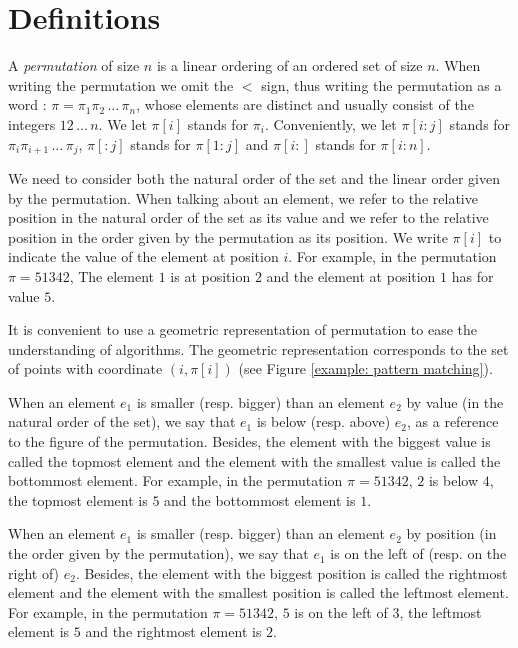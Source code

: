 \documentclass[a4paper]{llncs}
\begin{document}

\section{Definitions}
\label{section:Definitions}

A \textit{permutation} of size $n$ is a linear ordering of an ordered set of size $n$.
When writing the permutation we omit the $<$ sign, thus
writing the permutation as a word  :
$\pi = \pi_1\pi_2\,\ldots\,\pi_n$, whose elements are distinct
and usually consist of the integers $12\,\ldots\,n$. 
We let $\pi[i]$ stands for $\pi_i$.
Conveniently, we let
$\pi[i:j]$ stands for
$\pi_i\pi_{i+1}\,\ldots\,\pi_j$,
$\pi[:j]$ stands for $\pi[1:j]$ and
$\pi[i:]$ stands for $\pi[i:n]$.

We need to consider both the natural order of the set
and the linear order given by the permutation.
When talking about an element,
we refer to the relative position in
the natural order of the set
as its value 
and 
we refer to the relative position
in the order given by the permutation 
as its position.
We write 
$\pi[i]$ to indicate the value of the element 
at position $i$.  
For example, in the permutation $\pi = 51342$,
The element $1$ is at position $2$
and the element at position $1$ has for value $5$.

It is convenient to use a geometric representation of permutation
to ease the understanding of algorithms. 
The geometric representation corresponds to the set of points with coordinate $(i,\pi[i])$
(see Figure \ref{example: pattern matching}).


When an element $e_1$ is smaller (resp. bigger)
than an element $e_2$  by value (in the natural order of the set),
we say that $e_1$ is below (resp. above) $e_2$,
as a reference to the figure of the permutation.
Besides, the element with the biggest value is called
the topmost element and the element with the smallest value
is called the bottommost element.
For example, in the permutation $\pi = 51342$,
$2$ is below $4$, the topmost element is $5$
and the bottommost element is $1$.

When an element $e_1$ is smaller (resp. bigger)
than an element $e_2$  by position (in the order given by the permutation),
we say that $e_1$ is on the left of (resp. on the right of) $e_2$.
Besides, the element with the biggest position is called the rightmost element
and the element with the smallest position is called the leftmost element.
For example, in the permutation $\pi = 51342$,
$5$ is on the left of $3$, the leftmost element is $5$
and the rightmost element is $2$.
\end{document}
